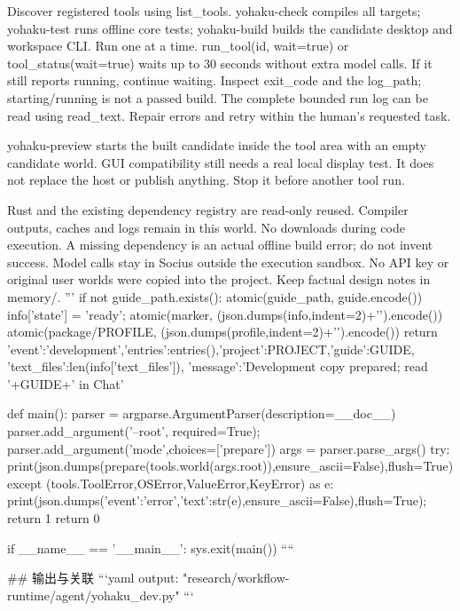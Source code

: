 Discover registered tools using list_tools. yohaku-check compiles all targets;
yohaku-test runs offline core tests; yohaku-build builds the candidate desktop
and workspace CLI. Run one at a time. run_tool(id, wait=true) or
tool_status(wait=true) waits up to 30 seconds without extra model calls. If it
still reports running, continue waiting. Inspect exit_code and the log_path;
starting/running is not a passed build. The complete bounded run log can be read
using read_text. Repair errors and retry within the human's requested task.

yohaku-preview starts the built candidate inside the tool area with an empty
candidate world. GUI compatibility still needs a real local display test. It
does not replace the host or publish anything. Stop it before another tool run.

Rust and the existing dependency registry are read-only reused. Compiler outputs,
caches and logs remain in this world. No downloads during code execution. A
missing dependency is an actual offline build error; do not invent success.
Model calls stay in Socius outside the execution sandbox. No API key or original
user worlds were copied into the project. Keep factual design notes in memory/.
'''
    if not guide_path.exists(): atomic(guide_path, guide.encode())
    info['state'] = 'ready'; atomic(marker, (json.dumps(info,indent=2)+'\n').encode())
    atomic(package/PROFILE, (json.dumps(profile,indent=2)+'\n').encode())
    return {'event':'development','entries':entries(),'project':PROJECT,'guide':GUIDE,
            'text_files':len(info['text_files']), 'message':'Development copy prepared; read '+GUIDE+' in Chat'}


def main():
    parser = argparse.ArgumentParser(description=__doc__)
    parser.add_argument('--root', required=True); parser.add_argument('mode',choices=['prepare'])
    args = parser.parse_args()
    try: print(json.dumps(prepare(tools.world(args.root)),ensure_ascii=False),flush=True)
    except (tools.ToolError,OSError,ValueError,KeyError) as e:
        print(json.dumps({'event':'error','text':str(e)},ensure_ascii=False),flush=True); return 1
    return 0

if __name__ == '__main__': sys.exit(main())
````

## 输出与关联
```yaml
output: "research/workflow-runtime/agent/yohaku_dev.py"
```
